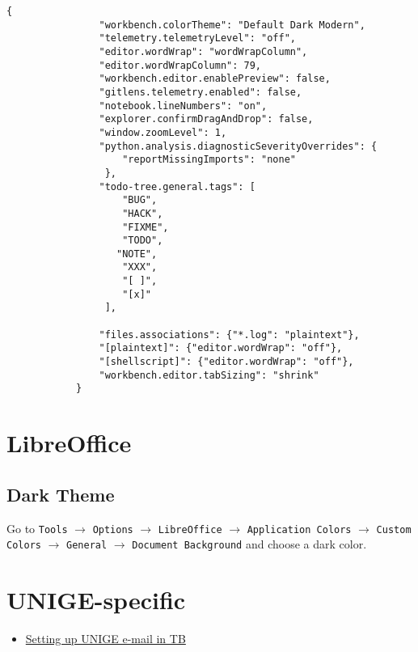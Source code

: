\documentclass[12pt, a4paper]{article}
\numberwithin{equation}{section}
\theoremstyle{definition}
\theoremstyle{definition}
\begin{document}
		\begin{lstlisting}[style=mystylebash, label=alg:vscode__settings_file, xleftmargin=\parindent]
			{
				"workbench.colorTheme": "Default Dark Modern",
				"telemetry.telemetryLevel": "off",
				"editor.wordWrap": "wordWrapColumn",
				"editor.wordWrapColumn": 79,
				"workbench.editor.enablePreview": false,
				"gitlens.telemetry.enabled": false,
				"notebook.lineNumbers": "on",
				"explorer.confirmDragAndDrop": false,
				"window.zoomLevel": 1, 
				"python.analysis.diagnosticSeverityOverrides": {
				    "reportMissingImports": "none"
				 }, 
			 	"todo-tree.general.tags": [
				    "BUG",
				    "HACK",
				    "FIXME",
				    "TODO",
			 	   "NOTE",
				    "XXX",
				    "[ ]",
				    "[x]"
				 ],

				"files.associations": {"*.log": "plaintext"},
				"[plaintext]": {"editor.wordWrap": "off"}, 
				"[shellscript]": {"editor.wordWrap": "off"},
				"workbench.editor.tabSizing": "shrink"
			}
		\end{lstlisting}
	
	\newpage 
	
	\section{LibreOffice}
	
	\subsection{Dark Theme}
	
		Go to \texttt{Tools} $\rightarrow$ \texttt{Options} $\rightarrow$ \texttt{LibreOffice} $\rightarrow$ \texttt{Application Colors} $\rightarrow$ \texttt{Custom Colors} $\rightarrow$ \texttt{General} $\rightarrow$ \texttt{Document Background} and choose a dark color.

	\newpage 
	
	\section{UNIGE-specific}
	
	\begin{itemize}
		\item \href{https://plone.unige.ch/distic/pub/messagerie/configuration/comment-configurer-compte-office365-thunderbird}{Setting up UNIGE e-mail in TB}
	\end{itemize}
	
\end{document}
